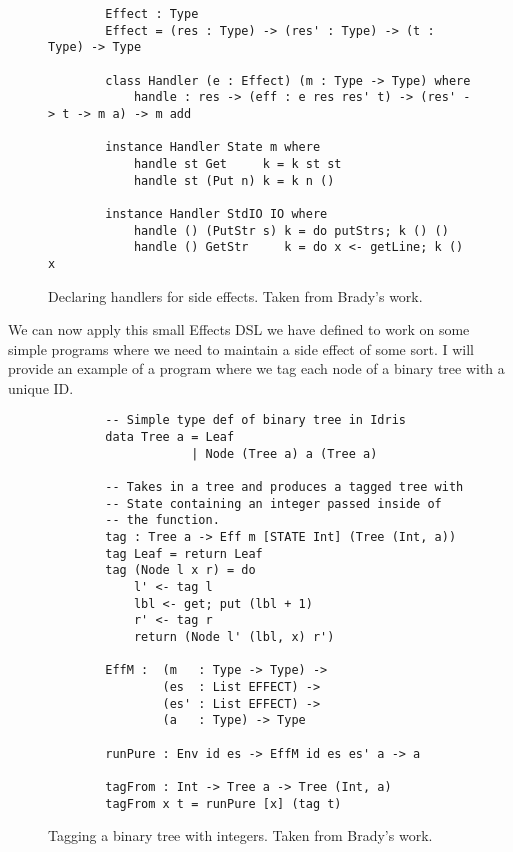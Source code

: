 \begin{figure}[ht!!!!]
    \caption{Declaring handlers for side effects. Taken from Brady's work.
    \protect\cite{algebraic}}
    \label{handlers}
    \begin{lstlisting}
        Effect : Type
        Effect = (res : Type) -> (res' : Type) -> (t : Type) -> Type

        class Handler (e : Effect) (m : Type -> Type) where
            handle : res -> (eff : e res res' t) -> (res' -> t -> m a) -> m add
        
        instance Handler State m where
            handle st Get     k = k st st
            handle st (Put n) k = k n ()
        
        instance Handler StdIO IO where
            handle () (PutStr s) k = do putStrs; k () ()
            handle () GetStr     k = do x <- getLine; k () x
    \end{lstlisting}
\end{figure}




We can now apply this small Effects DSL we have defined to work on some simple
programs where we need to maintain a side effect of some sort. I will provide an
example of a program where we tag each node of a binary tree with a unique ID. 

\begin{figure}[ht!!!!]
    \caption{Tagging a binary tree with integers. Taken from Brady's work.
    \protect\cite{algebraic}}
    \label{tag_def}
    \begin{lstlisting}
        -- Simple type def of binary tree in Idris
        data Tree a = Leaf
                    | Node (Tree a) a (Tree a)
        
        -- Takes in a tree and produces a tagged tree with
        -- State containing an integer passed inside of
        -- the function. 
        tag : Tree a -> Eff m [STATE Int] (Tree (Int, a))
        tag Leaf = return Leaf
        tag (Node l x r) = do
            l' <- tag l
            lbl <- get; put (lbl + 1)
            r' <- tag r
            return (Node l' (lbl, x) r')
        
        EffM :  (m   : Type -> Type) ->
                (es  : List EFFECT) ->
                (es' : List EFFECT) ->
                (a   : Type) -> Type
        
        runPure : Env id es -> EffM id es es' a -> a
        
        tagFrom : Int -> Tree a -> Tree (Int, a)
        tagFrom x t = runPure [x] (tag t)
    \end{lstlisting}
\end{figure}

